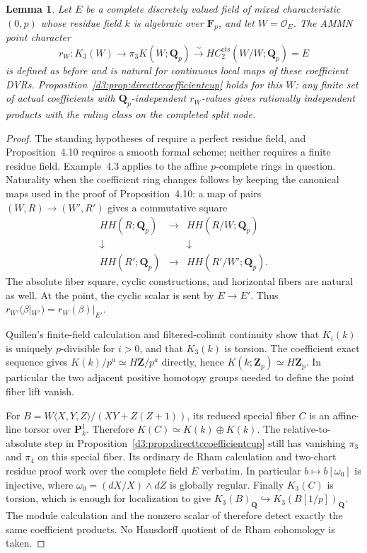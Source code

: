 \documentclass[11pt,a4paper]{amsart}
\numberwithin{equation}{section}
\newtheorem{lemma}[theorem]{Lemma}
\theoremstyle{definition}
\theoremstyle{remark}
\begin{document}
\begin{lemma}\label{d3:lem:directtcperfectcoeffcup}
Let $E$ be a complete discretely valued field of mixed characteristic
$(0,p)$ whose residue field $k$ is algebraic over $\mathbf F_p$, and
let $W=\mathcal O_E$. The AMMN point character
\[
 r_W:K_3(W)\longrightarrow\pi_3K(W;\mathbf Q_p)
       \xrightarrow{\sim}HC_2^{\mathrm{cts}}(W/W;\mathbf Q_p)=E
\]
is defined as before and is natural for continuous local maps of
these coefficient DVRs. Proposition~\ref{d3:prop:directtccoefficientcup}
holds for this $W$: any finite set of actual coefficients with
$\mathbf Q_p$-independent $r_W$-values gives rationally independent
products with the ruling class on the completed split node.
\end{lemma}
\begin{proof}
The standing hypotheses of \cite[Section~4.1]{AMMN} require a perfect
residue field, and Proposition~4.10 requires a smooth formal scheme;
neither requires a finite residue field. Example~4.3 applies to the
affine $p$-complete rings in question. Naturality when the coefficient
ring changes follows by keeping the canonical maps used in the proof
of Proposition~4.10: a map of pairs $(W,R)\to(W',R')$ gives a
commutative square
\[
\begin{matrix}
 HH(R;\mathbf Q_p)&\longrightarrow&HH(R/W;\mathbf Q_p)\\
 \downarrow&&\downarrow\\
 HH(R';\mathbf Q_p)&\longrightarrow&HH(R'/W';\mathbf Q_p).
\end{matrix}
\]
The absolute fiber square, cyclic constructions, and horizontal
fibers are natural as well. At the point, the cyclic scalar is sent
by $E\to E'$. Thus $r_{W'}(\beta|_{W'})=r_W(\beta)|_{E'}$.

Quillen's finite-field calculation and filtered-colimit continuity
show that $K_i(k)$ is uniquely $p$-divisible for $i>0$, and that
$K_3(k)$ is torsion. The coefficient exact sequence gives
$K(k)/p^a\simeq H\mathbf Z/p^a$ directly, hence
$K(k;\mathbf Z_p)\simeq H\mathbf Z_p$. In particular the two adjacent
positive homotopy groups needed to define the point fiber lift vanish.

For $B=W\langle X,Y,Z\rangle/(XY+Z(Z+1))$, its reduced special fiber
$C$ is an affine-line torsor over $\mathbf P^1_k$. Therefore
$K(C)\simeq K(k)\oplus K(k)$. The relative-to-absolute step in
Proposition~\ref{d3:prop:directtccoefficientcup} still has vanishing
$\pi_3$ and $\pi_4$ on this special fiber. Its ordinary de Rham
calculation and two-chart residue proof work over the complete field
$E$ verbatim. In particular $b\mapsto b[\omega_0]$ is injective,
where $\omega_0=(dX/X)\wedge dZ$ is globally regular. Finally
$K_3(C)$ is torsion, which is enough for localization to give
$K_3(B)_{\mathbf Q}\hookrightarrow K_3(B[1/p])_{\mathbf Q}$.
The module calculation and the nonzero scalar of
\cite[Proposition~4.12]{AMMN} therefore detect exactly the same
coefficient products. No Hausdorff quotient of de Rham cohomology
is taken.
\end{proof}
\end{document}

